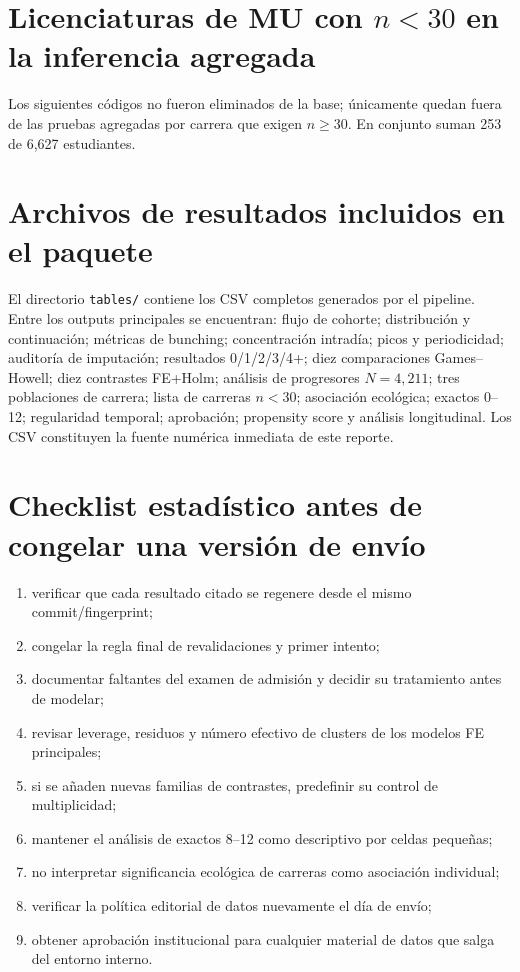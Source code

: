 \documentclass[11pt,letterpaper]{article}
\newcommand{\code}[1]{\texttt{#1}}
\begin{document}
\appendix
\section{Licenciaturas de MU con $n<30$ en la inferencia agregada}
\label{app:omitted}

Los siguientes códigos no fueron eliminados de la base; únicamente quedan fuera de las pruebas agregadas por carrera que exigen $n\ge30$. En conjunto suman 253 de 6,627 estudiantes.

\small

\normalsize

\section{Archivos de resultados incluidos en el paquete}

El directorio \code{tables/} contiene los CSV completos generados por el pipeline. Entre los outputs principales se encuentran: flujo de cohorte; distribución y continuación; métricas de bunching; concentración intradía; picos y periodicidad; auditoría de imputación; resultados 0/1/2/3/4+; diez comparaciones Games--Howell; diez contrastes FE+Holm; análisis de progresores $N=4,211$; tres poblaciones de carrera; lista de carreras $n<30$; asociación ecológica; exactos 0--12; regularidad temporal; aprobación; propensity score y análisis longitudinal. Los CSV constituyen la fuente numérica inmediata de este reporte.

\section{Checklist estadístico antes de congelar una versión de envío}

\begin{enumerate}[leftmargin=*]
\item verificar que cada resultado citado se regenere desde el mismo commit/fingerprint;
\item congelar la regla final de revalidaciones y primer intento;
\item documentar faltantes del examen de admisión y decidir su tratamiento antes de modelar;
\item revisar leverage, residuos y número efectivo de clusters de los modelos FE principales;
\item si se añaden nuevas familias de contrastes, predefinir su control de multiplicidad;
\item mantener el análisis de exactos 8--12 como descriptivo por celdas pequeñas;
\item no interpretar significancia ecológica de carreras como asociación individual;
\item verificar la política editorial de datos nuevamente el día de envío;
\item obtener aprobación institucional para cualquier material de datos que salga del entorno interno.
\end{enumerate}

\printbibliography
\end{document}
